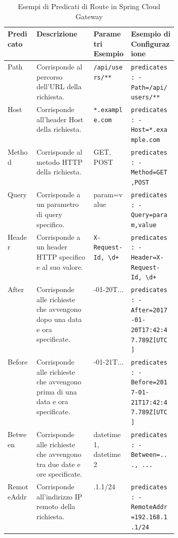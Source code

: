 \begin{table}[htbp]
\centering
\caption{Esempi di Predicati di Route in Spring Cloud Gateway}
\renewcommand{\arraystretch}{1.5}
\label{tab:predicati_scg}
\begin{tabularx}{\linewidth}{%
    >{\RaggedRight\arraybackslash}p{0.17\linewidth}
    >{\RaggedRight\arraybackslash}X
    >{\RaggedRight\arraybackslash}p{0.22\linewidth}
    >{\RaggedRight\arraybackslash}X
}
\toprule
\textbf{Predicato} & \textbf{Descrizione} & \textbf{Parametri Esempio} & \textbf{Esempio di Configurazione} \\
\midrule
Path & Corrisponde al percorso dell'URL della richiesta. & \lstinline{/api/users/**} & \lstinline{predicates: - Path=/api/users/**} \\
Host & Corrisponde all'header Host della richiesta. & \lstinline{*.example.com} & \lstinline{predicates: - Host=*.example.com} \\
Method & Corrisponde al metodo HTTP della richiesta. & GET, POST & \lstinline{predicates: - Method=GET,POST} \\
Query & Corrisponde a un parametro di query specifico. & param=value & \lstinline{predicates: - Query=param,value} \\
Header & Corrisponde a un header HTTP specifico e al suo valore. & \lstinline|X-Request-Id, \d+| & \lstinline|predicates: - Header=X-Request-Id, \d+| \\ 
After & Corrisponde alle richieste che avvengono dopo una data e ora specificate. & 2017-01-20T... & \lstinline|predicates: - After=2017-01-20T17:42:47.789Z[UTC]| \\ 
Before & Corrisponde alle richieste che avvengono prima di una data e ora specificate. & 2017-01-21T... & \lstinline|predicates: - Before=2017-01-21T17:42:47.789Z[UTC]| \\
Between & Corrisponde alle richieste che avvengono tra due date e ore specificate. & datetime1, datetime2 & \lstinline|predicates: - Between=..., ...| \\
RemoteAddr & Corrisponde all'indirizzo IP remoto della richiesta. & 192.168.1.1/24 & \lstinline{predicates: - RemoteAddr=192.168.1.1/24} \\
\bottomrule
\end{tabularx}
\end{table}

